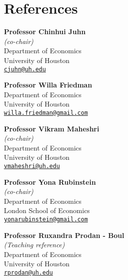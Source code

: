 \documentclass[10pt,letterpaper]{article}
\begin{document}
\section*{References}

\begin{minipage}[t]{0.5\textwidth}
  \textbf{Professor Chinhui Juhn}  \\
  \textit{(co-chair)}  \\
                   Department of Economics \\
                   University of Houston  \\
                   \href{mailto:cjuhn@uh.edu}{\tt cjuhn@uh.edu} \\
\end{minipage}
\begin{minipage}[t]{0.5\textwidth}
   \textbf{Professor Willa Friedman}  \\
                   Department of Economics \\
                   University of Houston  \\
                   \href{mailto:willa.friedman@gmail.com}{\tt willa.friedman@gmail.com} \\
\end{minipage}

\begin{minipage}[t]{0.5\textwidth}
   \textbf{Professor Vikram Maheshri}  \\
   \textit{(co-chair)}  \\
                   Department of Economics \\
                   University of Houston  \\
                   \href{mailto:vmaheshri@uh.edu}{\tt vmaheshri@uh.edu} \\
\end{minipage}
\begin{minipage}[t]{0.5\textwidth}
   \textbf{Professor Yona Rubinstein}  \\
   \textit{(co-chair)}  \\
                   Department of Economics \\
                   London School of Economics  \\
                   \href{mailto:yonarubinstein@gmail.com}{\tt yonarubinstein@gmail.com} \\
\end{minipage}

\begin{minipage}[t]{0.5\textwidth}
  \textbf{Professor Ruxandra Prodan - Boul} \\
  \textit{(Teaching reference)}  \\
                   Department of Economics \\
                   University of Houston  \\
                   \href{mailto:rprodan@uh.edu}{\tt rprodan@uh.edu} \\
\end{minipage}
\end{document}
